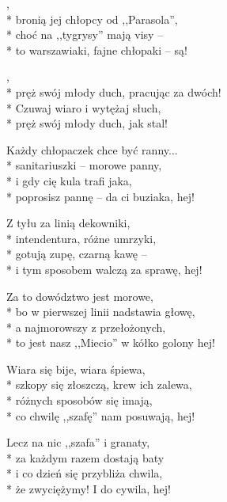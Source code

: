 \begin{lyrics}[longestline={to jest nasz ,,Miecio'' w kółko golony hej!}]

,\\*
bronią jej chłopcy od ,,Parasola'',\\*
choć na ,,tygrysy'' mają visy --\\*
to warszawiaki, fajne chłopaki -- są!

\begin{chorus}
,\\*
pręż swój młody duch, pracując za dwóch!\\*
Czuwaj wiaro i wytężaj słuch,\\*
pręż swój młody duch, jak stal!
\end{chorus}

Każdy chłopaczek chce być ranny...\\*
sanitariuszki -- morowe panny,\\*
i gdy cię kula trafi jaka,\\*
poprosisz pannę -- da ci buziaka, hej!

\chorusref

Z tyłu za linią dekowniki,\\*
intendentura, różne umrzyki,\\*
gotują zupę, czarną kawę --\\*
i tym sposobem walczą za sprawę, hej!

\chorusref

\breaklyrics

Za to dowództwo jest morowe,\\*
bo w pierwszej linii nadstawia głowę,\\*
a najmorowszy z przełożonych,\\*
to jest nasz ,,Miecio'' w kółko golony hej!

\chorusref

Wiara się bije, wiara śpiewa,\\*
szkopy się złoszczą, krew ich zalewa,\\*
różnych sposobów się imają,\\*
co chwilę ,,szafę'' nam posuwają, hej!

\chorusref

Lecz na nic ,,szafa'' i granaty,\\*
za każdym razem dostają baty\\*
i co dzień się przybliża chwila,\\*
że zwyciężymy! I do cywila, hej!

\chorusref
\end{lyrics}



